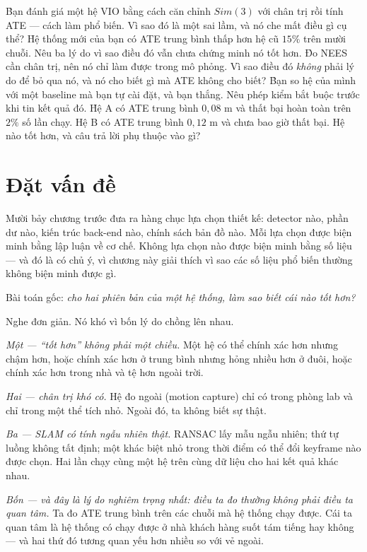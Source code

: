 \documentclass[../../vslam.tex]{subfiles}
\begin{document}
\begin{khoigoi}
\h{Bạn đánh giá một hệ VIO bằng cách căn chỉnh \(Sim(3)\) với chân trị rồi tính ATE --- cách làm phổ biến. Vì sao đó là một sai lầm, và nó che mất điều gì cụ thể?}
\h{Hệ thống mới của bạn có ATE trung bình thấp hơn hệ cũ \(15\%\) trên mười chuỗi. Nêu ba lý do vì sao điều đó vẫn chưa chứng minh nó tốt hơn.}
\h{Đo NEES cần chân trị, nên nó chỉ làm được trong mô phỏng. Vì sao điều đó \emph{không} phải lý do để bỏ qua nó, và nó cho biết gì mà ATE không cho biết?}
\h{Bạn so hệ của mình với một baseline mà bạn tự cài đặt, và bạn thắng. Nêu phép kiểm bắt buộc trước khi tin kết quả đó.}
\h{Hệ A có ATE trung bình \(0{,}08\) m và thất bại hoàn toàn trên \(2\%\) số lần chạy. Hệ B có ATE trung bình \(0{,}12\) m và chưa bao giờ thất bại. Hệ nào tốt hơn, và câu trả lời phụ thuộc vào gì?}
\end{khoigoi}

\section{Đặt vấn đề}

Mười bảy chương trước đưa ra hàng chục lựa chọn thiết kế: detector nào, phần dư nào, kiến trúc back-end nào, chính sách bản đồ nào. Mỗi lựa chọn được biện minh bằng lập luận về cơ chế. Không lựa chọn nào được biện minh bằng số liệu --- và đó là có chủ ý, vì chương này giải thích vì sao các số liệu phổ biến thường không biện minh được gì.

Bài toán gốc: \emph{cho hai phiên bản của một hệ thống, làm sao biết cái nào tốt hơn?}

Nghe đơn giản. Nó khó vì bốn lý do chồng lên nhau.

\emph{Một --- ``tốt hơn'' không phải một chiều.} Một hệ có thể chính xác hơn nhưng chậm hơn, hoặc chính xác hơn ở trung bình nhưng hỏng nhiều hơn ở đuôi, hoặc chính xác hơn trong nhà và tệ hơn ngoài trời.

\emph{Hai --- chân trị khó có.} Hệ đo ngoài (motion capture) chỉ có trong phòng lab và chỉ trong một thể tích nhỏ. Ngoài đó, ta không biết sự thật.

\emph{Ba --- SLAM có tính ngẫu nhiên thật.} RANSAC lấy mẫu ngẫu nhiên; thứ tự luồng không tất định; một khác biệt nhỏ trong thời điểm có thể đổi keyframe nào được chọn. Hai lần chạy cùng một hệ trên cùng dữ liệu cho hai kết quả khác nhau.

\emph{Bốn --- và đây là lý do nghiêm trọng nhất: điều ta đo thường không phải điều ta quan tâm.} Ta đo ATE trung bình trên các chuỗi mà hệ thống chạy được. Cái ta quan tâm là hệ thống có chạy được ở nhà khách hàng suốt tám tiếng hay không --- và hai thứ đó tương quan yếu hơn nhiều so với vẻ ngoài.
\end{document}
